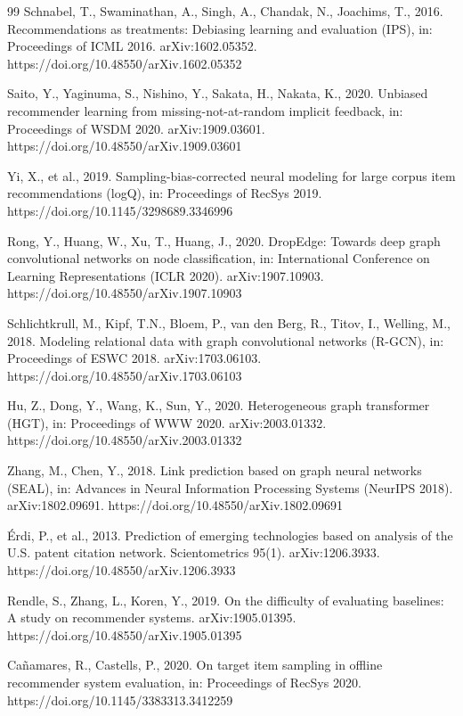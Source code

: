 \documentclass[preprint,12pt]{elsarticle}
\begin{document}
\begin{thebibliography}{99}
Schnabel, T., Swaminathan, A., Singh, A., Chandak, N., Joachims, T., 2016. Recommendations as treatments: Debiasing learning and evaluation (IPS), in: Proceedings of ICML 2016. arXiv:1602.05352. https://doi.org/10.48550/arXiv.1602.05352

Saito, Y., Yaginuma, S., Nishino, Y., Sakata, H., Nakata, K., 2020. Unbiased recommender learning from missing-not-at-random implicit feedback, in: Proceedings of WSDM 2020. arXiv:1909.03601. https://doi.org/10.48550/arXiv.1909.03601

Yi, X., et al., 2019. Sampling-bias-corrected neural modeling for large corpus item recommendations (logQ), in: Proceedings of RecSys 2019. https://doi.org/10.1145/3298689.3346996

Rong, Y., Huang, W., Xu, T., Huang, J., 2020. DropEdge: Towards deep graph convolutional networks on node classification, in: International Conference on Learning Representations (ICLR 2020). arXiv:1907.10903. https://doi.org/10.48550/arXiv.1907.10903

Schlichtkrull, M., Kipf, T.N., Bloem, P., van den Berg, R., Titov, I., Welling, M., 2018. Modeling relational data with graph convolutional networks (R-GCN), in: Proceedings of ESWC 2018. arXiv:1703.06103. https://doi.org/10.48550/arXiv.1703.06103

Hu, Z., Dong, Y., Wang, K., Sun, Y., 2020. Heterogeneous graph transformer (HGT), in: Proceedings of WWW 2020. arXiv:2003.01332. https://doi.org/10.48550/arXiv.2003.01332

Zhang, M., Chen, Y., 2018. Link prediction based on graph neural networks (SEAL), in: Advances in Neural Information Processing Systems (NeurIPS 2018). arXiv:1802.09691. https://doi.org/10.48550/arXiv.1802.09691

\'{E}rdi, P., et al., 2013. Prediction of emerging technologies based on analysis of the U.S. patent citation network. Scientometrics 95(1). arXiv:1206.3933. https://doi.org/10.48550/arXiv.1206.3933

Rendle, S., Zhang, L., Koren, Y., 2019. On the difficulty of evaluating baselines: A study on recommender systems. arXiv:1905.01395. https://doi.org/10.48550/arXiv.1905.01395

Ca\~{n}amares, R., Castells, P., 2020. On target item sampling in offline recommender system evaluation, in: Proceedings of RecSys 2020. https://doi.org/10.1145/3383313.3412259


\end{thebibliography}
\end{document}
